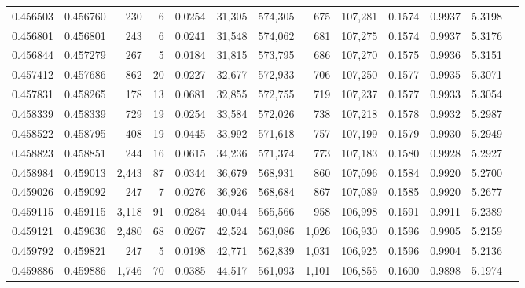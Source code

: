 \begin{tabular}{rrrrrrrrrrrrr}
0.456503 & 0.456760 &   230 &     6 &                                     0.0254 &  31,305 & 574,305 &     675 & 107,281 & 0.1574 & 0.9937 & 5.3198 \\
0.456801 & 0.456801 &   243 &     6 &                                     0.0241 &  31,548 & 574,062 &     681 & 107,275 & 0.1574 & 0.9937 & 5.3176 \\
0.456844 & 0.457279 &   267 &     5 &                                     0.0184 &  31,815 & 573,795 &     686 & 107,270 & 0.1575 & 0.9936 & 5.3151 \\
0.457412 & 0.457686 &   862 &    20 &                                     0.0227 &  32,677 & 572,933 &     706 & 107,250 & 0.1577 & 0.9935 & 5.3071 \\
0.457831 & 0.458265 &   178 &    13 &                                     0.0681 &  32,855 & 572,755 &     719 & 107,237 & 0.1577 & 0.9933 & 5.3054 \\
0.458339 & 0.458339 &   729 &    19 &                                     0.0254 &  33,584 & 572,026 &     738 & 107,218 & 0.1578 & 0.9932 & 5.2987 \\
0.458522 & 0.458795 &   408 &    19 &                                     0.0445 &  33,992 & 571,618 &     757 & 107,199 & 0.1579 & 0.9930 & 5.2949 \\
0.458823 & 0.458851 &   244 &    16 &                                     0.0615 &  34,236 & 571,374 &     773 & 107,183 & 0.1580 & 0.9928 & 5.2927 \\
0.458984 & 0.459013 & 2,443 &    87 &                                     0.0344 &  36,679 & 568,931 &     860 & 107,096 & 0.1584 & 0.9920 & 5.2700 \\
0.459026 & 0.459092 &   247 &     7 &                                     0.0276 &  36,926 & 568,684 &     867 & 107,089 & 0.1585 & 0.9920 & 5.2677 \\
0.459115 & 0.459115 & 3,118 &    91 &                                     0.0284 &  40,044 & 565,566 &     958 & 106,998 & 0.1591 & 0.9911 & 5.2389 \\
0.459121 & 0.459636 & 2,480 &    68 &                                     0.0267 &  42,524 & 563,086 &   1,026 & 106,930 & 0.1596 & 0.9905 & 5.2159 \\
0.459792 & 0.459821 &   247 &     5 &                                     0.0198 &  42,771 & 562,839 &   1,031 & 106,925 & 0.1596 & 0.9904 & 5.2136 \\
0.459886 & 0.459886 & 1,746 &    70 &                                     0.0385 &  44,517 & 561,093 &   1,101 & 106,855 & 0.1600 & 0.9898 & 5.1974 \\

\end{tabular}
